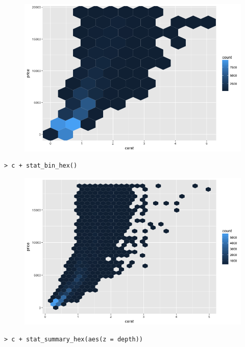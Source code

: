 \begin{figure}[H]\begin{center}\includegraphics[scale=1 ]{ilu/bg62.png}\end{center}\end{figure}
\begin{lstlisting}[language=html]
> c + stat_bin_hex()
\end{lstlisting}
\begin{figure}[H]\begin{center}\includegraphics[scale=1 ]{ilu/bg63.png}\end{center}\end{figure}
\begin{lstlisting}[language=html]
> c + stat_summary_hex(aes(z = depth))
\end{lstlisting}
